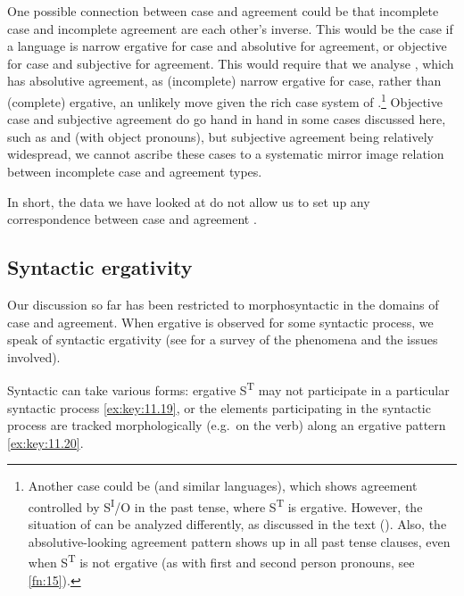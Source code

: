 \documentclass[output=paper]{langsci/langscibook}
\begin{document}
One possible connection between case and agreement  could be
that incomplete case  and incomplete agreement 
are each other’s inverse. This would be the case if a language is narrow
ergative for case and absolutive for agreement, or objective for case and
subjective for agreement.  This would require that we analyse , which
has absolutive agreement, as (incomplete) narrow ergative for case, rather than
(complete) ergative, an unlikely move given the rich case system of 
\citep{Polinsky2014}.\footnote{Another case could be  (and similar
    languages), which shows agreement controlled by S\textsuperscript{I}/O in
    the past tense, where S\textsuperscript{T} is ergative. However, the
    situation of  can be analyzed differently, as discussed in the
    text ().  Also, the absolutive-looking agreement pattern shows up in all past
    tense clauses, even when S\textsuperscript{T} is not ergative (as with
first and second person pronouns, see \cref{fn:15}).} Objective case and
subjective agreement do go hand in hand in some cases discussed here, such as
 and  (with object pronouns), but subjective
agreement being relatively widespread, we cannot ascribe these cases to a
systematic mirror image relation between incomplete case and agreement types.

In short, the data we have looked at do not allow us to set up any
correspondence between case and agreement .

\subsection{Syntactic ergativity}\label{sec:key:11.5.5}

Our discussion so far has been restricted to morphosyntactic  in
the domains of case and agreement. When ergative  is observed
for some syntactic process, we speak of syntactic ergativity
(see \citealt{Deal2016} for a survey of the phenomena and the issues involved).

Syntactic  can take various forms: ergative S\textsuperscript{T} may
not participate in a particular syntactic process \eqref{ex:key:11.19}, or the elements
participating in the syntactic process are tracked morphologically (e.g.\ on
the verb) along an ergative  pattern
\eqref{ex:key:11.20}.\newpage
\end{document}
